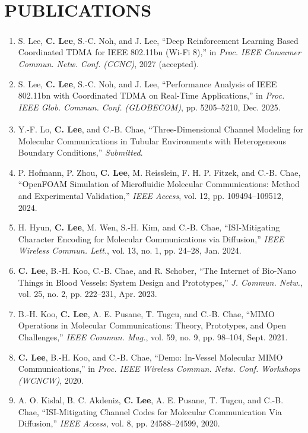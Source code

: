 \documentclass[a4paper,9pt]{extarticle}
\begin{document}
\section*{PUBLICATIONS}
\par
\begin{enumerate}
    \item S. Lee\textsuperscript{\dag}, \textbf{C. Lee}\textsuperscript{\dag}, S.-C. Noh, and J. Lee, ``Deep Reinforcement Learning Based Coordinated TDMA for IEEE 802.11bn (Wi-Fi 8),'' in \textit{Proc. IEEE Consumer Commun. Netw. Conf. (CCNC)}, 2027 (accepted).
    \item S. Lee, \textbf{C. Lee}, S.-C. Noh, and J. Lee, ``Performance Analysis of IEEE 802.11bn with Coordinated TDMA on Real-Time Applications,'' in \textit{Proc. IEEE Glob. Commun. Conf. (GLOBECOM)}, pp. 5205--5210, Dec. 2025.
    \item Y.-F. Lo\textsuperscript{\dag}, \textbf{C. Lee}\textsuperscript{\dag}, and C.-B. Chae, ``Three-Dimensional Channel Modeling for Molecular Communications in Tubular Environments with Heterogeneous Boundary Conditions,'' \textit{Submitted}.
    \item P. Hofmann, P. Zhou, \textbf{C. Lee}, M. Reisslein, F. H. P. Fitzek, and C.-B. Chae, ``OpenFOAM Simulation of Microfluidic Molecular Communications: Method and Experimental Validation,'' \textit{IEEE Access}, vol. 12, pp. 109494--109512, 2024.
    \item H. Hyun, \textbf{C. Lee}, M. Wen, S.-H. Kim, and C.-B. Chae, ``ISI-Mitigating Character Encoding for Molecular Communications via Diffusion,'' \textit{IEEE Wireless Commun. Lett.}, vol. 13, no. 1, pp. 24--28, Jan. 2024.
    \item \textbf{C. Lee}, B.-H. Koo, C.-B. Chae, and R. Schober, ``The Internet of Bio-Nano Things in Blood Vessels: System Design and Prototypes,'' \textit{J. Commun. Netw.}, vol. 25, no. 2, pp. 222--231, Apr. 2023.
    \item B.-H. Koo, \textbf{C. Lee}, A. E. Pusane, T. Tugcu, and C.-B. Chae, ``MIMO Operations in Molecular Communications: Theory, Prototypes, and Open Challenges,'' \textit{IEEE Commun. Mag.}, vol. 59, no. 9, pp. 98--104, Sept. 2021.
    \item \textbf{C. Lee}, B.-H. Koo, and C.-B. Chae, ``Demo: In-Vessel Molecular MIMO Communications,'' in \textit{Proc. IEEE Wireless Commun. Netw. Conf. Workshops (WCNCW)}, 2020.
    \item A. O. Kislal, B. C. Akdeniz, \textbf{C. Lee}, A. E. Pusane, T. Tugcu, and C.-B. Chae, ``ISI-Mitigating Channel Codes for Molecular Communication Via Diffusion,'' \textit{IEEE Access}, vol. 8, pp. 24588--24599, 2020.

\end{enumerate}
\end{document}
